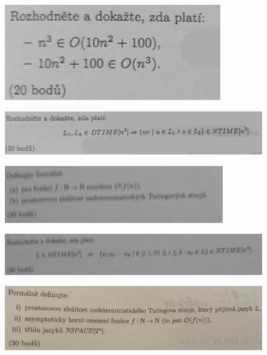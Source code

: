 \documentclass[]{article}
\begin{document}
	\begin{figure}[H]
		\includegraphics[width=\textwidth]{tasks/zlozitost/task2.png}
	\end{figure}

	\begin{figure}[H]
		\includegraphics[width=\textwidth]{tasks/zlozitost/task3.png}
	\end{figure}
	
	\begin{figure}[H]
		\includegraphics[width=\textwidth]{tasks/zlozitost/task4.png}
	\end{figure}

	\begin{figure}[H]
		\includegraphics[width=\textwidth]{tasks/zlozitost/task5.png}
	\end{figure}

	\begin{figure}[H]
		\includegraphics[width=\textwidth]{tasks/zlozitost/task6.png}
	\end{figure}
	
\end{document}
